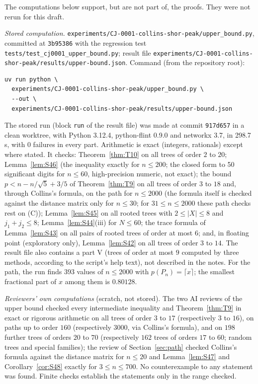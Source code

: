 \documentclass[11pt]{amsart}
\theoremstyle{definition}
\theoremstyle{remark}
\begin{document}
The computations below support, but are not part of, the proofs. They were
not rerun for this draft.

\emph{Stored computation.} \nolinkurl{experiments/CJ-0001-collins-shor-peak/upper_bound.py},
committed at \texttt{3b95386} with the regression test
\nolinkurl{tests/test_cj0001_upper_bound.py}; result file
\nolinkurl{experiments/CJ-0001-collins-shor-peak/results/upper-bound.json}. Command
(from the repository root):
\begin{verbatim}
uv run python \
  experiments/CJ-0001-collins-shor-peak/upper_bound.py \
  --out \
  experiments/CJ-0001-collins-shor-peak/results/upper-bound.json
\end{verbatim}
The stored run (block \texttt{run} of the result file) was made at commit
\texttt{917d657} in a clean worktree, with Python 3.12.4, python-flint 0.9.0
and networkx 3.7, in 298.7 s, with 0 failures in every part. Arithmetic is
exact (integers, rationals) except where stated. It checks: Theorem~\ref{thm:T10}
on all trees of order $2$ to $20$; Lemma~\ref{lem:S46} (the inequality
exactly for $n\le200$; the closed form to 50 significant digits for
$n\le60$, high-precision numeric, not exact); the bound $p<n-n/\sqrt5+3/5$
of Theorem~\ref{thm:T9} on all trees of order $3$ to $18$ and, through
Collins's formula, on the path for $n\le2000$ (the formula itself is checked
against the distance matrix only for $n\le30$; for $31\le n\le2000$ these
path checks rest on (C)); Lemma~\ref{lem:S45} on all rooted trees with
$2\le|X|\le8$ and $j_1+j_2\le8$; Lemma~\ref{lem:S44}(iii) for $N\le60$; the
trace formula of Lemma~\ref{lem:S43} on all pairs of rooted trees of order
at most $6$; and, in floating point (exploratory only), Lemma~\ref{lem:S42}
on all trees of order $3$ to $14$. The result file also contains a part V
(trees of order at most $9$ computed by three methods, according to the
script's help text), not described in the notes. For the path, the run
finds 393 values of $n\le2000$ with $p(P_n)=\lceil x\rceil$; the smallest
fractional part of $x$ among them is $0.80128$.

\emph{Reviewers' own computations} (scratch, not stored). The two AI reviews
of the upper bound checked every intermediate inequality and
Theorem~\ref{thm:T9} in exact or rigorous arithmetic on all trees of order
$3$ to $17$ (respectively $3$ to $16$), on paths up to order $160$
(respectively $3000$, via Collins's formula), and on $198$ further trees of
orders $20$ to $70$ (respectively $162$ trees of orders $17$ to $60$; random
trees and special families); the review of Section~\ref{sec:path} checked
Collins's formula against the distance matrix for $n\le20$ and
Lemma~\ref{lem:S47} and Corollary~\ref{cor:S48} exactly for $3\le n\le700$.
No counterexample to any statement was found. Finite checks establish the
statements only in the range checked.
\end{document}
